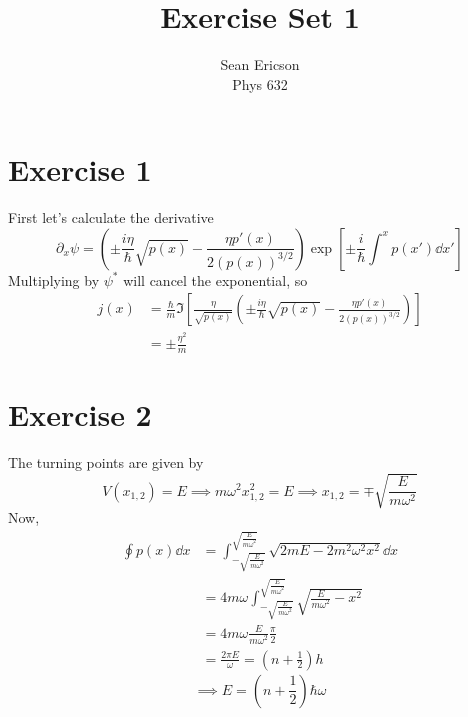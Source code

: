\documentclass[12pt]{article}
\newcommand{\cint}[2]{\int_{#1}^{#2}}
\begin{document}
	
\title{Exercise Set 1}
\author{Sean Ericson \\ Phys 632}
\maketitle

\section*{Exercise 1}
First let's calculate the derivative
\[ \partial_x\psi = \left(\pm\frac{i\eta}{\hbar} \sqrt{p(x)} -\frac{\eta p'(x)}{2(p(x))^{3/2}}\right) \exp[\pm \frac{i}{\hbar}\int^x p(x') \dd x' ] \]
Multiplying by $\psi^*$ will cancel the exponential, so
\begin{align*}
    j(x) & = \frac{\hbar}{m}\Im\left[\frac{\eta}{\sqrt{p(x)}}\left(\pm\frac{i\eta}{\hbar} \sqrt{p(x)} -\frac{\eta p'(x)}{2(p(x))^{3/2}}\right)\right] \\
    & = \pm \frac{\eta^2}{m}
\end{align*}


\section*{Exercise 2}
The turning points are given by
\[ V(x_{1,2}) = E \implies m\omega^2x_{1,2}^2 = E \implies x_{1,2} = \mp\sqrt{\frac{E}{m\omega^2}} \]
Now,
\begin{align*}
    \oint p(x)\dd x & = \cint{-\sqrt{\frac{E}{m\omega^2}}}{\sqrt{\frac{E}{m\omega^2}}} \sqrt{2mE - 2m^2\omega^2x^2} \dd x \\
    & = 4m\omega \cint{-\sqrt{\frac{E}{m\omega^2}}}{\sqrt{\frac{E}{m\omega^2}}} \sqrt{\frac{E}{m\omega^2} - x^2} \\
    & = 4m\omega \frac{E}{m\omega^2}\frac{\pi}{2} \\
    & = \frac{2\pi E}{\omega}  = \left(n + \frac{1}{2}\right)h
\end{align*}
\[ \implies E = \left(n + \frac{1}{2}\right)\hbar\omega \]    
\end{document}
